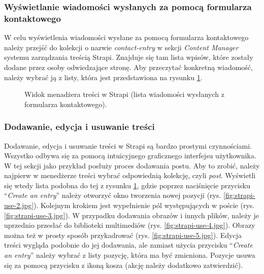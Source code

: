 \documentclass[a4paper, 12pt, twoside]{article}
\numberwithin{figure}{section}
\begin{document}
\begin{sloppypar}
\subsubsection*{Wyświetlanie wiadomości wysłanych za pomocą formularza kontaktowego}

W celu wyświetlenia wiadomości wysłane za pomocą formularza kontaktowego należy przejść do kolekcji o nazwie \textit{contact-entry} w sekcji \textit{Content Manager} systemu zarządzania treścią Strapi. Znajduje się tam lista wpisów, które zostały dodane przez osoby odwiedzające stronę. Aby przeczytać konkretną wiadomość, należy wybrać ją z listy, która jest przedstawiona na rysunku \ref{fig:strapi-use-1.jpg}. 

\begin{figure}[H] 
    \centering
   \caption{Widok menadżera treści w Strapi (lista wiadomości wysłanych z formularza kontaktowego).}
   \label{fig:strapi-use-1.jpg}
\end{figure}

\subsubsection*{Dodawanie, edycja i usuwanie treści}

Dodawanie, edycja i usuwanie treści w Strapi są bardzo prostymi czynnościami. Wszystko odbywa się za pomocą intuicyjnego graficznego interfejsu użytkownika. W tej sekcji jako przykład posłuży proces dodawania postu. Aby to zrobić, należy najpierw w menedżerze treści wybrać odpowiednią kolekcję, czyli \textit{post}. Wyświetli się wtedy lista podobna do tej z rysunku \ref{fig:strapi-use-1.jpg}, gdzie poprzez naciśnięcie przycisku ``\textit{Create an entry}'' należy otworzyć okno tworzenia nowej pozycji (rys. \ref{fig:strapi-use-2.jpg}). Kolejnym krokiem jest wypełnienie pól występujących w poście (rys. \ref{fig:strapi-use-3.jpg}). W przypadku dodawania obrazów i innych plików, należy je uprzednio przesłać do biblioteki multimediów (rys. \ref{fig:strapi-use-4.jpg}). Obrazy można też w prosty sposób przykadrować (rys. \ref{fig:strapi-use-5.jpg}). Edycja treści wygląda podobnie do jej dodawania, ale zamiast użycia przycisku ``\textit{Create an entry}'' należy wybrać z listy pozycję, która ma być zmieniona. Pozycje usuwa się za pomocą przycisku z ikoną kosza (akcję należy dodatkowo zatwierdzić). 


\end{sloppypar}
\end{document}

